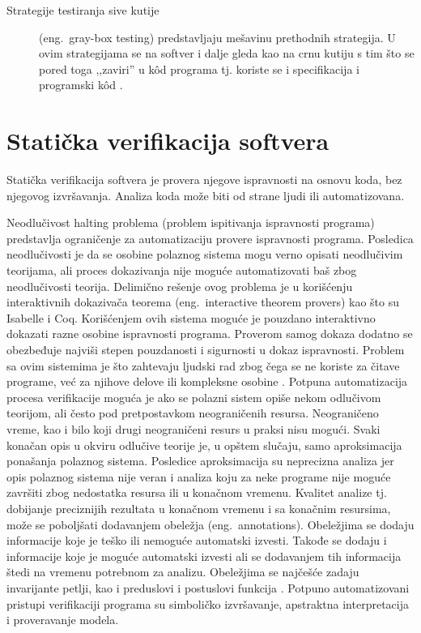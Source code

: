 \documentclass[12pt,oneside]{memoir}
\begin{document}
\begin{description}
\item [Strategije testiranja sive kutije] (eng.~gray-box testing) predstavljaju mešavinu prethodnih strategija. U ovim strategijama se na softver i dalje gleda kao na crnu kutiju s tim što se pored toga ,,zaviri'' u  k\^od programa tj. koriste se i specifikacija i programski k\^od \cite{mvj, SoftTest}.
\end{description}



\section{Statička verifikacija softvera}
Statička verifikacija softvera je provera njegove ispravnosti na osnovu koda, bez njegovog izvršavanja. Analiza koda može biti od strane ljudi ili automatizovana. 



Neodlučivost halting problema (problem ispitivanja ispravnosti programa) predstavlja ograničenje za automatizaciju provere ispravnosti programa. Posledica neodlučivosti je da se osobine polaznog sistema mogu verno opisati neodlučivim teorijama, ali proces dokazivanja nije moguće automatizovati baš zbog neodlučivosti teorija. Delimično rešenje ovog problema je u korišćenju interaktivnih dokazivača teorema (eng.~interactive theorem provers) kao što su Isabelle i Coq. Korišćenjem ovih sistema moguće je pouzdano interaktivno dokazati razne osobine ispravnosti programa. Proverom samog dokaza dodatno se obezbeđuje najviši stepen pouzdanosti i sigurnosti u dokaz ispravnosti. Problem sa ovim sistemima je što zahtevaju ljudski rad zbog čega se ne koriste za čitave programe, već za njihove delove ili kompleksne osobine \cite{mvj}. 
Potpuna automatizacija procesa verifikacije moguća je ako se polazni sistem opiše nekom odlučivom teorijom, ali često pod pretpostavkom neograničenih resursa. Neograničeno vreme, kao i bilo koji drugi neograničeni resurs u praksi nisu mogući. Svaki konačan opis u okviru odlučive teorije je, u opštem slučaju, samo aproksimacija ponašanja polaznog sistema. Posledice aproksimacija su neprecizna analiza jer opis polaznog sistema nije veran i analiza koju za neke programe nije moguće završiti zbog nedostatka resursa ili u konačnom vremenu. 
Kvalitet analize tj. dobijanje preciznijih rezultata u konačnom vremenu i sa konačnim resursima, može se poboljšati dodavanjem obeležja (eng.~annotations). Obeležjima se dodaju informacije koje je teško ili nemoguće automatski izvesti. Takođe se dodaju i informacije koje je moguće automatski izvesti ali se dodavanjem tih informacija štedi na vremenu potrebnom za analizu. Obeležjima se najčešće zadaju invarijante petlji, kao i preduslovi i postuslovi funkcija \cite{mvj}. 
Potpuno automatizovani pristupi verifikaciji programa su simboličko izvršavanje, apstraktna interpretacija i proveravanje modela. 
\end{document}
